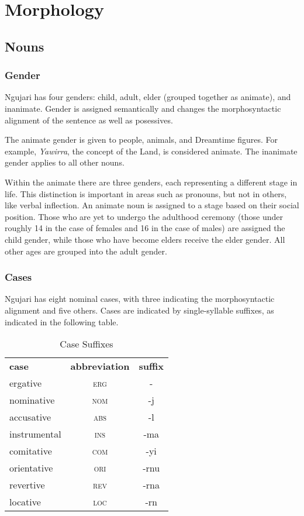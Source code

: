 \chapter{Morphology}

\section{Nouns}

\subsection{Gender}

Ngujari has four genders: child, adult, elder (grouped together as animate), and
inanimate. Gender is assigned semantically and changes the morphosyntactic
alignment of the sentence as well as posessives.

The animate gender is given to people, animals, and Dreamtime figures. For
example, \textit{Yawirra}, the concept of the Land, is considered animate. The
inanimate gender applies to all other nouns.

Within the animate there are three genders, each representing a different stage
in life. This distinction is important in areas such as pronouns, but not in
others, like verbal inflection. An animate noun is assigned to a stage based on
their social position. Those who are yet to undergo the adulthood ceremony
(those under roughly 14 in the case of females and 16 in the case of males) are
assigned the child gender, while those who have become elders receive the elder
gender. All other ages are grouped into the adult gender.

\subsection{Cases}

Ngujari has eight nominal cases, with three indicating the morphosyntactic
alignment and five others. Cases are indicated by single-syllable suffixes, as
indicated in the following table.

\begin{table}[h]
\centering
\begin{tabular}{lcc}
\textbf{case} & \textbf{abbreviation} & \textbf{suffix}\\
ergative & \textsc{erg} & -\\
nominative & \textsc{nom} & -j\\
accusative & \textsc{abs} & -l\\
instrumental & \textsc{ins} & -ma\\
comitative & \textsc{com} & -yi\\
orientative & \textsc{ori} & -rnu\\
revertive & \textsc{rev} & -rna\\
locative & \textsc{loc} & -rn\\
\end{tabular}
\caption{Case Suffixes}
\end{table}

